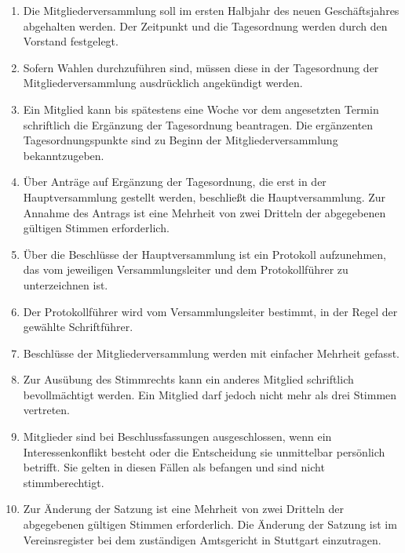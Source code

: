 \begin{enumerate}
    \item \label{sa:abs:rskrke} Die Mitgliederversammlung soll im ersten Halbjahr des neuen Geschäftsjahres abgehalten werden. Der Zeitpunkt und die Tagesordnung werden durch den Vorstand festgelegt.

    \item \label{sa:abs:oictw8} Sofern Wahlen durchzuführen sind, müssen diese in der Tagesordnung der Mitgliederversammlung ausdrücklich angekündigt werden.

    \item \label{sa:abs:5eke2t} Ein Mitglied kann bis spätestens eine Woche vor dem angesetzten Termin schriftlich die Ergänzung der Tagesordnung beantragen. Die ergänzenten Tagesordnungspunkte sind zu Beginn der Mitgliederversammlung bekanntzugeben. 

    \item \label{sa:abs:krmbqv} Über Anträge auf Ergänzung der Tagesordnung, die erst in der Hauptversammlung gestellt werden, beschließt die Hauptversammlung. Zur Annahme des Antrags ist eine Mehrheit von zwei Dritteln der abgegebenen gültigen Stimmen erforderlich.

    \item \label{sa:abs:mwaefv} Über die Beschlüsse der Hauptversammlung ist ein Protokoll aufzunehmen, das vom jeweiligen Versammlungsleiter und dem Protokollführer zu unterzeichnen ist. 

    \item \label{sa:abs:5y62wg} Der Protokollführer wird vom Versammlungsleiter bestimmt, in der Regel der gewählte Schriftführer.

    \item \label{sa:abs:el2t5w} Beschlüsse der Mitgliederversammlung werden mit einfacher Mehrheit gefasst.

    \item \label{sa:abs:3dyngf} Zur Ausübung des Stimmrechts kann ein anderes Mitglied schriftlich bevollmächtigt werden. Ein Mitglied darf jedoch nicht mehr als drei Stimmen vertreten.

    \item \label{sa:abs:su36y8} Mitglieder sind bei Beschlussfassungen ausgeschlossen, wenn ein Interessenkonflikt besteht oder die Entscheidung sie unmittelbar persönlich betrifft. Sie gelten in diesen Fällen als befangen und sind nicht stimmberechtigt.

    \item \label{sa:abs:hmn70e} Zur Änderung der Satzung ist eine Mehrheit von zwei Dritteln der abgegebenen gültigen Stimmen erforderlich. Die Änderung der Satzung ist im Vereinsregister bei dem zuständigen Amtsgericht in Stuttgart einzutragen.


\end{enumerate}
